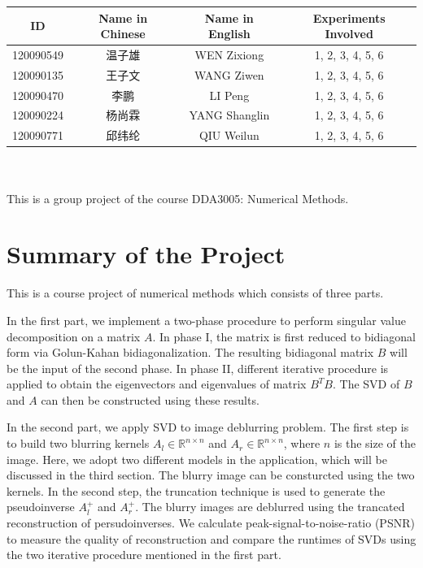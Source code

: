 \begin{titlepage}
\vspace*{\fill}
\begin{center}
    \Large
    \begin{tabular}{ |c|c|c|c|} 
    \hline
     ID &Name in Chinese & Name in English & Experiments Involved \\ 
     \hline
     120090549 &温子雄 &WEN Zixiong &  1, 2, 3, 4, 5, 6 \\
     \hline
     120090135 &王子文 & WANG Ziwen & 1, 2, 3, 4, 5, 6 \\ 
     \hline
     120090470 &李鹏 & LI Peng & 1, 2, 3, 4, 5, 6 \\
     \hline
     120090224 &杨尚霖 & YANG Shanglin & 1, 2, 3, 4, 5, 6 \\
     \hline
     120090771 &邱纬纶 & QIU Weilun & 1, 2, 3, 4, 5, 6 \\
     \hline
    \end{tabular}
    \\[1.0 cm]
    \\
    This is a group project of the course DDA3005: Numerical Methods. 
    
\end{center}
\vspace*{\fill}

\end{titlepage}

\tableofcontents
\pagebreak

\rmfamily
\section{Summary of the Project}
This is a course project of numerical methods which consists of three parts.

In the first part, we implement a two-phase procedure to perform singular value decomposition on a matrix $A$. In phase I, the matrix is first reduced to bidiagonal form via Golun-Kahan bidiagonalization. The resulting bidiagonal matrix $B$ will be the input of the second phase. In phase II, different iterative procedure is applied to obtain the eigenvectors and eigenvalues of matrix $B^TB$. The SVD of $B$ and $A$ can then be constructed using these results.

In the second part, we apply SVD to image deblurring problem. The first step is to build two blurring kernels $A_l \in \mathbb{R}^{n \times n}$ and $A_r \in \mathbb{R}^{n \times n}$, where $n$ is the size of the image. Here, we adopt two different models in the application, which will be discussed in the third section. The blurry image can be consturcted using the two kernels. In the second step, the truncation technique is used to generate the pseudoinverse $A_l^+$ and $A_r^+$. The blurry images are deblurred using the trancated reconstruction of persudoinverses. We calculate peak-signal-to-noise-ratio (PSNR) to measure the quality of reconstruction and compare the runtimes of SVDs using the two iterative procedure mentioned in the first part. 

